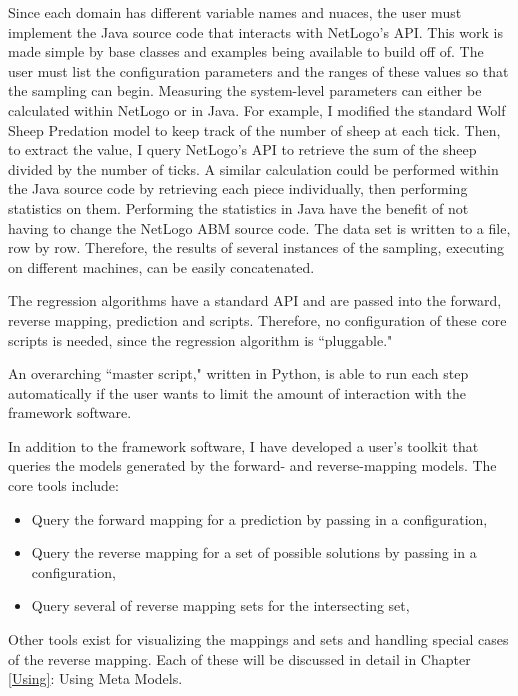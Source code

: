 Since each domain has different variable names and nuaces, the user must implement the Java source code that interacts with NetLogo's API.
This work is made simple by base classes and examples being available to build off of.
The user must list the configuration parameters and the ranges of these values so that the sampling can begin.
Measuring the system-level parameters can either be calculated within NetLogo or in Java.
For example, I modified the standard Wolf Sheep Predation model to keep track of the number of sheep at each tick.
Then, to extract the value, I query NetLogo's API to retrieve the sum of the sheep divided by the number of ticks.
A similar calculation could be performed within the Java source code by retrieving each piece individually, then performing statistics on them.
Performing the statistics in Java have the benefit of not having to change the NetLogo ABM source code.
The data set is written to a file, row by row.
Therefore, the results of several instances of the sampling, executing on different machines, can be easily concatenated.

The regression algorithms have a standard API and are passed into the forward, reverse mapping, prediction and scripts.
Therefore, no configuration of these core scripts is needed, since the regression algorithm is ``pluggable."

An overarching ``master script," written in Python, is able to run each step automatically if the user wants to limit the amount of interaction with the framework software.

In addition to the framework software, I have developed a user's toolkit that queries the models generated by the forward- and reverse-mapping models.
The core tools include:
\begin{itemize}
   \item Query the forward mapping for a prediction by passing in a configuration,
   \item Query the reverse mapping for a set of possible solutions by passing in a configuration,
   \item Query several of reverse mapping sets for the intersecting set,
\end{itemize}
Other tools exist for visualizing the mappings and sets and handling special cases of the reverse mapping.
Each of these will be discussed in detail in Chapter \ref{Using}: Using Meta Models.


